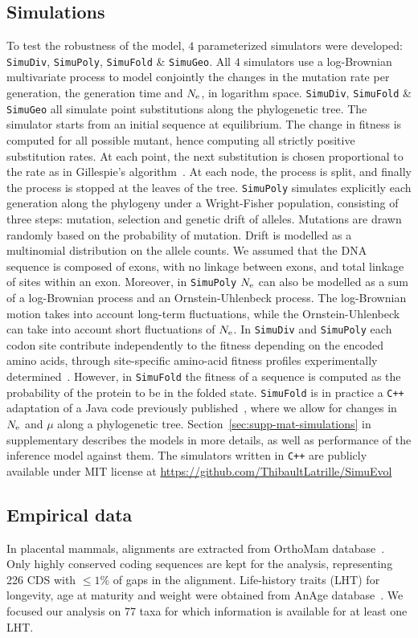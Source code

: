 \subsection{Simulations}
\label{sec:Simulation}
To test the robustness of the model, $4$ parameterized simulators were developed: \texttt{SimuDiv}, \texttt{SimuPoly}, \texttt{SimuFold} \& \texttt{SimuGeo}.
All $4$ simulators use a log-Brownian multivariate process to model conjointly the changes in the mutation rate per generation, the generation time and $N_{\text{e}}$, in logarithm space.
\texttt{SimuDiv}, \texttt{SimuFold} \& \texttt{SimuGeo} all simulate point substitutions along the phylogenetic tree.
The simulator starts from an initial sequence at equilibrium.
The change in fitness is computed for all possible mutant, hence computing all strictly positive substitution rates.
At each point, the next substitution is chosen proportional to the rate as in Gillespie's algorithm~\citep{Gillespie1977}.
At each node, the process is split, and finally the process is stopped at the leaves of the tree.
\texttt{SimuPoly} simulates explicitly each generation along the phylogeny under a Wright-Fisher population, consisting of three steps: mutation, selection and genetic drift of alleles.
Mutations are drawn randomly based on the probability of mutation.
Drift is modelled as a multinomial distribution on the allele counts.
We assumed that the \acrshort{DNA} sequence is composed of exons, with no linkage between exons, and total linkage of sites within an exon.
Moreover, in \texttt{SimuPoly} $N_{\text{e}}$ can also be modelled as a sum of a log-Brownian process and an Ornstein-Uhlenbeck process.
The log-Brownian motion takes into account long-term fluctuations, while the Ornstein-Uhlenbeck can take into account short fluctuations of $N_{\text{e}}$.
In \texttt{SimuDiv} and \texttt{SimuPoly} each codon site contribute independently to the fitness depending on the encoded amino acids, through site-specific amino-acid fitness profiles experimentally determined~\citep{Bloom2017}.
However, in \texttt{SimuFold} the fitness of a sequence is computed as the probability of the protein to be in the folded state.
\texttt{SimuFold} is in practice a \texttt{C++} adaptation of a Java code previously published~\citep{Goldstein2016, Goldstein2017}, where we allow for changes in $N_{\text{e}}$ and $\mu$ along a phylogenetic tree.
Section~\ref{sec:supp-mat-simulations} in supplementary describes the models in more details, as well as performance of the inference model against them.
The simulators written in \texttt{C++} are publicly available under MIT license at \url{https://github.com/ThibaultLatrille/SimuEvol}

\subsection{Empirical data}
In placental mammals, alignments are extracted from OrthoMam database~\citep{Ranwez2007,Scornavacca2019}.
Only highly conserved coding sequences are kept for the analysis, representing 226 CDS with $\leq 1\%$ of gaps in the alignment.
Life-history traits (\acrshort{LHT}) for longevity, age at maturity and weight were obtained from AnAge database~\citep{DEMAGALHAES2009,Tacutu2012}.
We focused our analysis on 77 taxa for which information is available for at least one \acrshort{LHT}.
